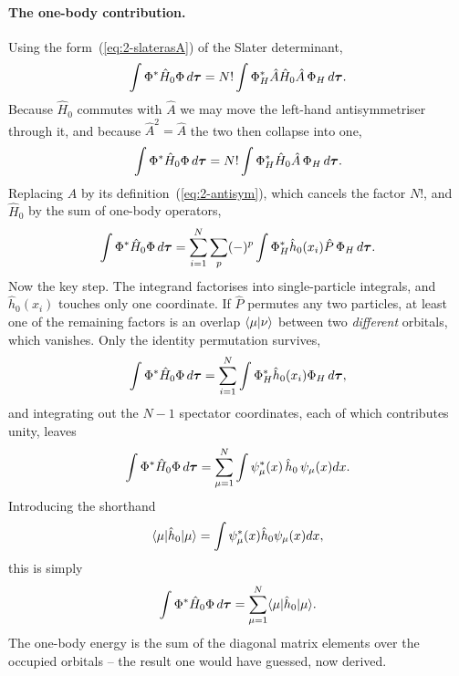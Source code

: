 \paragraph{The one-body contribution.}
Using the form~(\ref{eq:2-slaterasA}) of the Slater determinant,
\begin{equation}
  \int \Phi^{*}\hat{H}_0\Phi\,d\bm{\tau}
   = N!\int \Phi_H^{*}\hat{A}\hat{H}_0\hat{A}\,\Phi_H\,d\bm{\tau} .
  \label{eq:2-onebody1}
\end{equation}
Because $\hat{H}_0$ commutes with $\hat{A}$ we may move the left-hand
antisymmetriser through it, and because $\hat{A}^2=\hat{A}$ the two then
collapse into one,
\begin{equation}
  \int \Phi^{*}\hat{H}_0\Phi\,d\bm{\tau}
   = N!\int \Phi_H^{*}\hat{H}_0\hat{A}\,\Phi_H\,d\bm{\tau} .
  \label{eq:2-onebody2}
\end{equation}
Replacing $\hat{A}$ by its definition~(\ref{eq:2-antisym}), which cancels the
factor $N!$, and $\hat{H}_0$ by the sum of one-body operators,
\begin{equation}
  \int \Phi^{*}\hat{H}_0\Phi\,d\bm{\tau}
   = \sum_{i=1}^{N}\sum_{p}(-)^{p}
     \int \Phi_H^{*}\hat{h}_0(x_i)\hat{P}\,\Phi_H\,d\bm{\tau} .
  \label{eq:2-onebody3}
\end{equation}
Now the key step.  The integrand factorises into single-particle integrals,
and $\hat{h}_0(x_i)$ touches only one coordinate.  If $\hat{P}$ permutes any
two particles, at least one of the remaining factors is an overlap
$\langle \mu \vert \nu \rangle$ between two \emph{different} orbitals, which vanishes.
Only the identity permutation survives,
\begin{equation}
  \int \Phi^{*}\hat{H}_0\Phi\,d\bm{\tau}
   = \sum_{i=1}^{N}\int \Phi_H^{*}\hat{h}_0(x_i)\Phi_H\,d\bm{\tau} ,
  \label{eq:2-onebody4}
\end{equation}
and integrating out the $N-1$ spectator coordinates, each of which
contributes unity, leaves
\begin{equation}
  \int \Phi^{*}\hat{H}_0\Phi\,d\bm{\tau}
   = \sum_{\mu=1}^{N}\int \psi_{\mu}^{*}(x)\,\hat{h}_0\,\psi_{\mu}(x)dx .
  \label{H1Expectation}
\end{equation}
Introducing the shorthand
\begin{equation}
  \langle \mu|\hat{h}_0|\mu\rangle
   = \int \psi_{\mu}^{*}(x)\hat{h}_0\psi_{\mu}(x)dx,
  \label{eq:2-onebodyshorthand}
\end{equation}
this is simply
\begin{equation}
  \int \Phi^{*}\hat{H}_0\Phi\,d\bm{\tau}
   = \sum_{\mu=1}^{N}\langle\mu|\hat{h}_0|\mu\rangle .
  \label{H1Expectation1}
\end{equation}
The one-body energy is the sum of the diagonal matrix elements over the
occupied orbitals -- the result one would have guessed, now derived.

